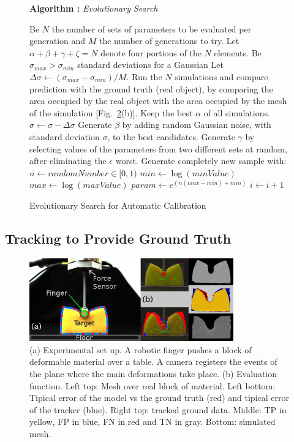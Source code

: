 \documentclass[journal]{IEEEtran}
\newcommand{\fref}[1]{Fig.~\ref{#1}}
\newcounter{algorithm}
\newenvironment{algorithmicieee}[1]
  {\refstepcounter{algorithm}
   \begin{lrbox}{\ieeealgbox}
   \begin{minipage}{\dimexpr\columnwidth-2\fboxsep-2\fboxrule}
   \textbf{Algorithm \arabic{algorithm}:} \textit{#1} \par
   \begin{algorithmic}[1]}
  {\end{algorithmic}
   \end{minipage}
   \end{lrbox}\noindent\fbox{\usebox{\ieeealgbox}}}
\begin{document}
\begin{figure}
  \begin{algorithmicieee}{Evolutionary Search}\label{alg:genetic}
 \STATE Be $N$ the number of sets of parameters to be evaluated per generation and $M$ the number of generations to try.
 \STATE Let $\alpha + \beta + \gamma + \zeta = N$ denote four portions of the $N$ elements.
 \STATE Be $\sigma_{max} > \sigma_{min}$ standard deviations for a Gaussian
 \STATE Let $\Delta\sigma \gets (\sigma_{max} - \sigma_{min})/M$.
 \STATE Run the $N$ simulations and compare prediction with the ground truth (real object), by comparing the area occupied by the real object with the area occupied by the mesh of the simulation [\fref{fig:scene}(b)].
 \STATE Keep the best $\alpha$ of all simulations.
 \STATE $\sigma \gets \sigma - \Delta\sigma$
 \STATE Generate $\beta$ by adding random Gaussian noise, with standard deviation $\sigma$, to the best candidates.
 \STATE Generate $\gamma$ by selecting values of the parameters from two different sets at random, after eliminating the $\epsilon$ worst.
   \STATE Generate completely new sample with:
     \STATE $n \leftarrow randomNumber \in [0,1)$
     \STATE $min \leftarrow \log(minValue)$
     \STATE $max \leftarrow \log(maxValue)$
     \STATE $param \leftarrow e^{(n (max - min) + min)}$
   \ENDFOR
 \ENDFOR
 \STATE $i \gets i + 1$
 \ENDFOR
\end{algorithmicieee}
 \caption{Evolutionary Search for Automatic Calibration}
\end{figure}

\subsection{Tracking to Provide Ground Truth}

\begin{figure}[!t]
\centering
\includegraphics[width=88mm]{arrio2}
\caption{(a) Experimental set up.  A robotic finger pushes a block of deformable material over a table.  A camera registers the events of the plane where the main deformations take place.  (b) Evaluation function.  Left top: Mesh over real block of material.  Left bottom: Tipical error of the model vs the ground truth (red) and tipical error of the tracker (blue).  Right top: tracked ground data.  Middle: TP in yellow, FP in blue, FN in red and TN in gray.  Bottom: simulated mesh. }
\label{fig:scene}
\end{figure}
\end{document}
